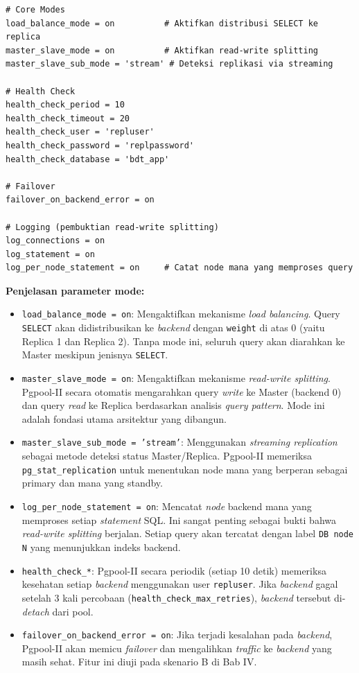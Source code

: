 \begin{lstlisting}[caption={Konfigurasi Mode Pgpool-II
(docker/pgpool/pgpool.conf)}, label={lst:pgpool-mode}]
# Core Modes
load_balance_mode = on          # Aktifkan distribusi SELECT ke replica
master_slave_mode = on          # Aktifkan read-write splitting
master_slave_sub_mode = 'stream' # Deteksi replikasi via streaming

# Health Check
health_check_period = 10
health_check_timeout = 20
health_check_user = 'repluser'
health_check_password = 'replpassword'
health_check_database = 'bdt_app'

# Failover
failover_on_backend_error = on

# Logging (pembuktian read-write splitting)
log_connections = on
log_statement = on
log_per_node_statement = on     # Catat node mana yang memproses query
\end{lstlisting}

\textbf{Penjelasan parameter mode:}
\begin{itemize}
    \item \texttt{load\_balance\_mode = on}: Mengaktifkan mekanisme
    \textit{load balancing}. Query \texttt{SELECT} akan didistribusikan
    ke \textit{backend} dengan \texttt{weight} di atas 0 (yaitu Replica
    1 dan Replica 2). Tanpa mode ini, seluruh query akan diarahkan ke
    Master meskipun jenisnya \texttt{SELECT}.
    \item \texttt{master\_slave\_mode = on}: Mengaktifkan mekanisme
    \textit{read-write splitting}. Pgpool-II secara otomatis
    mengarahkan query \textit{write} ke Master (backend 0) dan query
    \textit{read} ke Replica berdasarkan analisis \textit{query
    pattern}. Mode ini adalah fondasi utama arsitektur yang dibangun.
    \item \texttt{master\_slave\_sub\_mode = 'stream'}: Menggunakan
    \textit{streaming replication} sebagai metode deteksi status
    Master/Replica. Pgpool-II memeriksa \texttt{pg\_stat\_replication}
    untuk menentukan node mana yang berperan sebagai primary dan mana
    yang standby.
    \item \texttt{log\_per\_node\_statement = on}: Mencatat
    \textit{node} backend mana yang memproses setiap \textit{statement}
    SQL. Ini sangat penting sebagai bukti bahwa \textit{read-write
    splitting} berjalan. Setiap query akan tercatat dengan label
    \texttt{DB node N} yang menunjukkan indeks backend.
    \item \texttt{health\_check\_*}: Pgpool-II secara periodik (setiap
    10 detik) memeriksa kesehatan setiap \textit{backend} menggunakan
    user \texttt{repluser}. Jika \textit{backend} gagal setelah 3 kali
    percobaan (\texttt{health\_check\_max\_retries}), \textit{backend}
    tersebut di-\textit{detach} dari pool.
    \item \texttt{failover\_on\_backend\_error = on}: Jika terjadi
    kesalahan pada \textit{backend}, Pgpool-II akan memicu
    \textit{failover} dan mengalihkan \textit{traffic} ke
    \textit{backend} yang masih sehat. Fitur ini diuji pada skenario B
    di Bab IV.
\end{itemize}

